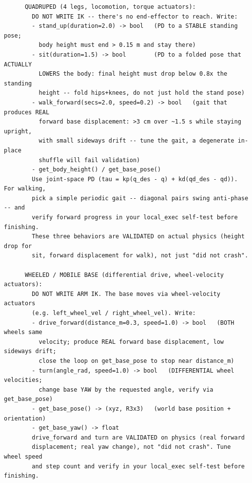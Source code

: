 {\begin{verbatim}
      QUADRUPED (4 legs, locomotion, torque actuators):
        DO NOT WRITE IK -- there's no end-effector to reach. Write:
        - stand_up(duration=2.0) -> bool   (PD to a STABLE standing pose;
          body height must end > 0.15 m and stay there)
        - sit(duration=1.5) -> bool        (PD to a folded pose that ACTUALLY
          LOWERS the body: final height must drop below 0.8x the standing
          height -- fold hips+knees, do not just hold the stand pose)
        - walk_forward(secs=2.0, speed=0.2) -> bool   (gait that produces REAL
          forward base displacement: >3 cm over ~1.5 s while staying upright,
          with small sideways drift -- tune the gait, a degenerate in-place
          shuffle will fail validation)
        - get_body_height() / get_base_pose()
        Use joint-space PD (tau = kp(q_des - q) + kd(qd_des - qd)). For walking,
        pick a simple periodic gait -- diagonal pairs swing anti-phase -- and
        verify forward progress in your local_exec self-test before finishing.
        These three behaviors are VALIDATED on actual physics (height drop for
        sit, forward displacement for walk), not just "did not crash".

      WHEELED / MOBILE BASE (differential drive, wheel-velocity actuators):
        DO NOT WRITE ARM IK. The base moves via wheel-velocity actuators
        (e.g. left_wheel_vel / right_wheel_vel). Write:
        - drive_forward(distance_m=0.3, speed=1.0) -> bool   (BOTH wheels same
          velocity; produce REAL forward base displacement, low sideways drift;
          close the loop on get_base_pose to stop near distance_m)
        - turn(angle_rad, speed=1.0) -> bool   (DIFFERENTIAL wheel velocities;
          change base YAW by the requested angle, verify via get_base_pose)
        - get_base_pose() -> (xyz, R3x3)   (world base position + orientation)
        - get_base_yaw() -> float
        drive_forward and turn are VALIDATED on physics (real forward
        displacement; real yaw change), not "did not crash". Tune wheel speed
        and step count and verify in your local_exec self-test before finishing.


\end{verbatim}}

